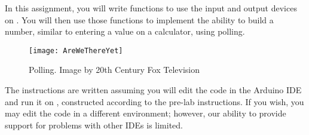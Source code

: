 


\usepackage{enumitem}
\usepackage{graphicx}
\usepackage{addfont}
\usepackage{subfig}
\usepackage{multicol}




\renewcommand{\labnumber}{\pollinglabnumber}
\renewcommand{\labname}{Using Polling with Memory-Mapped Input/Output}
\renewcommand{\shortlabname}{memory-mapped i/o -- pollinglab}
\renewcommand{\collaborationrules}{\pollinglabcollaboration}
\renewcommand{\duedate}{\pollinglabdue}
\newcommand{\nano}{\developmentboard} %
\renewcommand{\runtimeenvironment}{\pollinglabenvironment}
\pagelayout

\labidentifier

In this assignment, you will write functions to use the input and output
devices on \runtimeenvironment. You will then use those functions to implement
the ability to build a number, similar to entering a value on a calculator,
using polling.

\begin{figure}[h]
    \centering
    \texttt{[image: AreWeThereYet]}
    \caption{Polling. \tiny Image by 20th Century Fox Television}
\end{figure}

The instructions are written assuming you will edit the code in the Arduino IDE
and run it on \runtimeenvironment, constructed according to the pre-lab
instructions. If you wish, you may edit the code in a different environment;
however, our ability to provide support for problems with other IDEs is limited.

